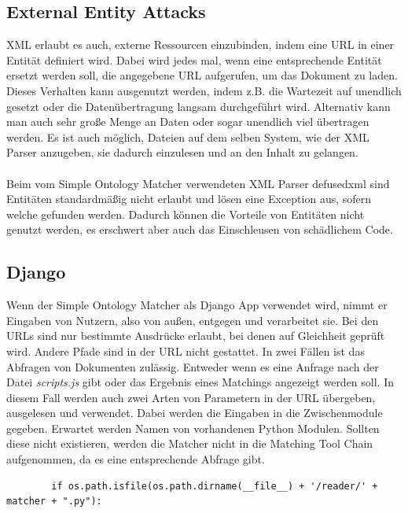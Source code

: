 		\subsection{External Entity Attacks}
		XML erlaubt es auch, externe Ressourcen einzubinden, indem eine URL in einer
		Entität definiert wird. Dabei wird jedes mal, wenn eine entsprechende Entität
		ersetzt werden soll, die angegebene URL aufgerufen, um das Dokument zu laden.
		Dieses Verhalten kann ausgenutzt werden, indem z.B. die Wartezeit auf
		unendlich gesetzt oder die Datenübertragung langsam durchgeführt wird.
		Alternativ kann man auch sehr große Menge an Daten oder sogar unendlich viel
		übertragen werden.\cite{Sul09}
		Es ist auch möglich, Dateien auf dem selben System, wie der XML Parser
		anzugeben, sie dadurch einzulesen und an den Inhalt zu gelangen.\cite{defusedxml}
		\\
		\\
		Beim vom Simple Ontology Matcher verwendeten XML Parser defusedxml sind
		Entitäten standardmäßig nicht erlaubt und lösen eine
		Exception aus, sofern welche gefunden werden.\cite{defusedxml}
		Dadurch können die Vorteile von Entitäten nicht genutzt werden, es erschwert
		aber auch das Einschleusen von schädlichem Code.
		
		\subsection{Django}
		Wenn der Simple Ontology Matcher als Django App verwendet wird, nimmt er
		Eingaben von Nutzern, also von außen, entgegen und verarbeitet sie. Bei den
		URLs sind nur bestimmte Ausdrücke erlaubt, bei denen auf Gleichheit geprüft
		wird. Andere Pfade sind in der URL nicht gestattet. In zwei Fällen ist das
		Abfragen von Dokumenten zulässig.
		Entweder wenn es eine Anfrage nach der Datei \textit{scripts.js} gibt oder das Ergebnis
		eines Matchings angezeigt werden soll. In diesem Fall werden auch zwei Arten
		von Parametern in der URL übergeben, ausgelesen und verwendet. Dabei werden
		die Eingaben in die Zwischenmodule gegeben. Erwartet werden Namen von
		vorhandenen Python Modulen. Sollten diese nicht existieren, werden die
		Matcher nicht in die Matching Tool Chain aufgenommen, da es eine
		entsprechende Abfrage gibt.
		\begin{lstlisting}
		if os.path.isfile(os.path.dirname(__file__) + '/reader/' + matcher + ".py"):
		\end{lstlisting}
		
